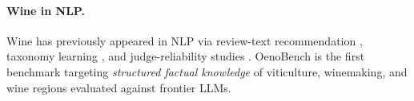 \paragraph{Wine in NLP.} Wine has previously appeared in NLP via
review-text recommendation \citep{chen2014winerec}, taxonomy learning
\citep{lefever2017winenlp}, and judge-reliability studies
\citep{hodgson2017winereviews}. OenoBench is the first benchmark
targeting \emph{structured factual knowledge} of viticulture,
winemaking, and wine regions evaluated against frontier LLMs.
